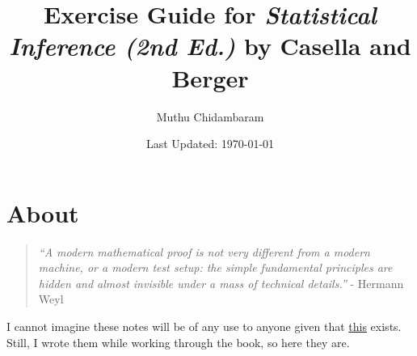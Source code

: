 \documentclass{article}
\begin{document}
\title{Exercise Guide for \textit{Statistical Inference (2nd Ed.)} by Casella and Berger}
\author{Muthu Chidambaram}
\date{Last Updated: \today}

\maketitle

\tableofcontents
\newpage 

\section*{About}

\begin{quote}
        \textit{``A modern mathematical proof is not very different from a modern machine,
or a modern test setup: the simple fundamental principles are hidden 
and almost invisible under a mass of technical details.''} - Hermann Weyl
\end{quote}

I cannot imagine these notes will be of any use to anyone given that 
\href{http://exampleproblems.com/Solutions-Casella-Berger.pdf}{this} exists.
Still, I wrote them while working through the book, so here they are.


\end{document}
